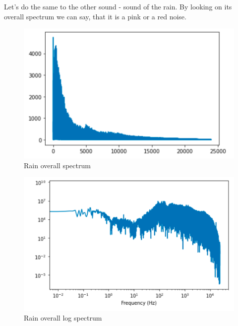 \documentclass[a4paper]{article}
\begin{document}
        Let's do the same to the other sound - sound of the rain. By looking on its overall spectrum we can say, that it is a pink or a red noise.
        \begin{figure}[H]
            \centering
            \includegraphics[width=\textwidth]{img/sea_overall.png}
            \caption{Rain overall spectrum}
            \label{fig:part1_2_1}
        \end{figure}
        \begin{figure}[H]
            \centering
            \includegraphics[width=\textwidth]{img/rain_overall_log.png}
            \caption{Rain overall log spectrum}
            \label{fig:part1_2_2}
        \end{figure}
        
\end{document}
